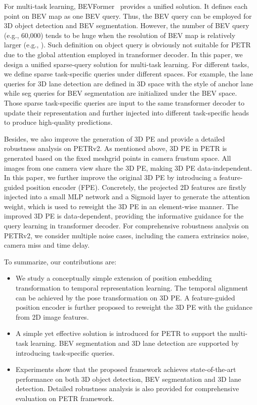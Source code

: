 \documentclass[10pt,twocolumn,letterpaper]{article}
\begin{document}
For multi-task learning, BEVFormer~\cite{li2022bevformer} provides a unified solution. It defines each point on BEV map as one BEV query. Thus, the BEV query can be employed for 3D object detection and BEV segmentation. However, the number of BEV query (e.g., 60,000) tends to be huge when the resolution of BEV map is relatively larger (e.g., ). Such definition on object query is obviously not suitable for PETR due to the global attention employed in transformer decoder. In this paper, we design a unified sparse-query solution for multi-task learning. For different tasks, we define  sparse task-specific queries under different spaces. For example, the lane queries for 3D lane detection are defined in 3D space with the style of anchor lane while seg queries for BEV segmentation are initialized under the BEV space. Those sparse task-specific queries are input to the same transformer decoder to update their representation and further injected into different task-specific heads to produce high-quality predictions.

Besides, we also improve the generation of 3D PE and provide a detailed robustness analysis on PETRv2. As mentioned above, 3D PE in PETR is generated based on the fixed meshgrid points in camera frustum space. All images from one camera view share the 3D PE, making 3D PE data-independent. In this paper, we further improve the original 3D PE by introducing a feature-guided position encoder (FPE). Concretely, the projected 2D features are firstly injected into a small MLP network and a Sigmoid layer to generate the attention weight, which is used to reweight the 3D PE in an element-wise manner. The improved 3D PE is data-dependent, providing the informative guidance for the query learning in transformer decoder. 
For comprehensive robustness analysis on PETRv2, we consider multiple noise cases, including the camera extrinsics noise, camera miss and time delay. 

To summarize, our contributions are:
\begin{itemize}
\item We study a conceptually simple extension of position embedding transformation to temporal representation learning. The temporal alignment can be achieved by the pose transformation on 3D PE. A feature-guided position encoder is further proposed to reweight the 3D PE with the guidance from 2D image features.
\item A simple yet effective solution is introduced for PETR to support the multi-task learning. BEV segmentation and 3D lane detection are supported by introducing task-specific queries.
\item Experiments show that the proposed framework achieves state-of-the-art performance on both 3D object detection, BEV segmentation and 3D lane detection. Detailed robustness analysis is also provided for comprehensive evaluation on PETR framework.
\end{itemize}
\end{document}

